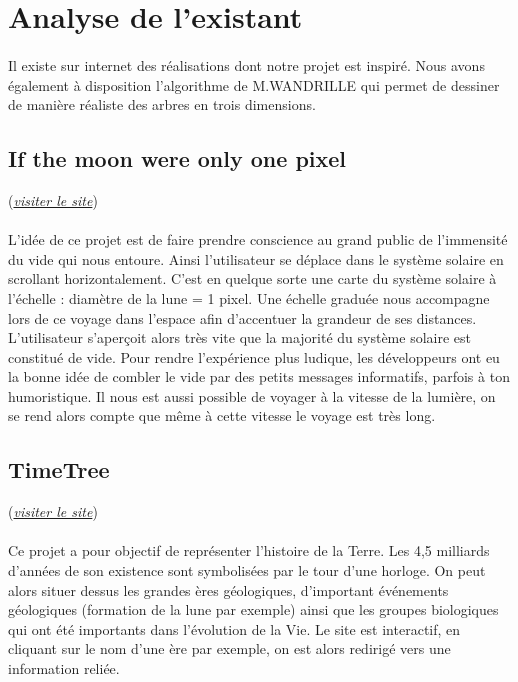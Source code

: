 \documentclass[a4paper]{article}
\begin{document}
\section{Analyse de l'existant}
\paragraph{}
Il existe sur internet des réalisations dont notre projet est inspiré. Nous avons également à disposition l'algorithme de M.WANDRILLE qui permet de dessiner de manière réaliste des arbres en trois dimensions.     
	      	 

	\subsection{If the moon were only one pixel}
	 (\href{http://joshworth.com/dev/pixelspace/pixelspace_solarsystem.html}{\emph{visiter le site}}) 
	\paragraph{}
	L’idée de ce projet est de faire prendre conscience au grand public de l'immensité du vide qui nous entoure. Ainsi l'utilisateur se déplace dans le système solaire en scrollant horizontalement. C'est en quelque sorte une carte du système solaire à l'échelle : diamètre de la lune = 1 pixel. Une échelle graduée nous accompagne lors de ce voyage dans l'espace afin d'accentuer la grandeur de ses distances. L'utilisateur s’aperçoit alors très vite que la majorité du système solaire est constitué de vide. Pour rendre l'expérience plus ludique, les développeurs ont eu la bonne idée de combler le vide par des petits messages informatifs, parfois à ton humoristique. Il nous est aussi possible de voyager à la vitesse de la lumière, on se rend alors compte que même à cette vitesse le voyage est très long.         
 		
	\subsection{TimeTree}
	(\href{http://deeptime.info/}{\emph{visiter le site}})
	\paragraph{}
	Ce projet a pour objectif de représenter l'histoire de la Terre. Les 4,5 milliards d'années de son existence sont symbolisées par le tour d'une horloge. On peut alors situer dessus les grandes ères géologiques, d'important événements géologiques (formation de la lune par exemple) ainsi que les groupes biologiques qui ont été importants dans l'évolution de la Vie. Le site est interactif, en cliquant sur le nom d'une ère par exemple, on est alors redirigé vers une information reliée.      
	
\end{document}
